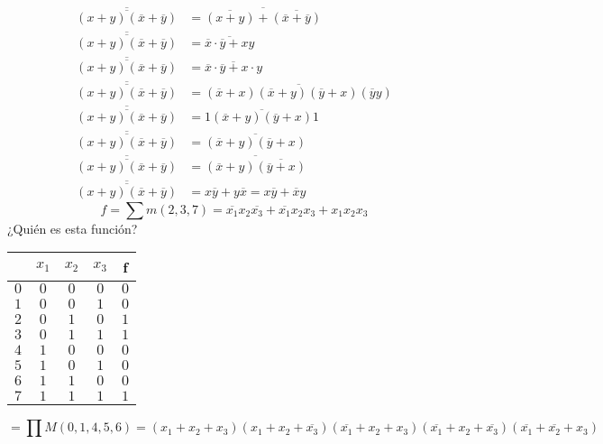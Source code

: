 \documentclass[../main.tex]{subfiles}
\begin{document}
\begin{align*}
	\overline{\overline{(x+y)(\overline{x}+\overline{y})}} &=
	\overline{\overline{(x+y)}+\overline{(\overline{x}+\overline{y})}}\\
	\overline{\overline{(x+y)(\overline{x}+\overline{y})}} &=
	\overline{\overline{x}\cdot\overline{y}+xy}\\
	\overline{\overline{(x+y)(\overline{x}+\overline{y})}} &=
	\overline{\overline{x}\cdot\overline{y}+x\cdot y}\\
	\overline{\overline{(x+y)(\overline{x}+\overline{y})}} &=
	\overline{(\overline{x}+x)(\overline{x}+y)(\overline{y}+x)(\overline{y}y)}\\
	\overline{\overline{(x+y)(\overline{x}+\overline{y})}} &=
	\overline{1(\overline{x}+y)(\overline{y}+x)1}\\
	\overline{\overline{(x+y)(\overline{x}+\overline{y})}} &=
	\overline{(\overline{x}+y)(\overline{y}+x)}\\
	\overline{\overline{(x+y)(\overline{x}+\overline{y})}} &=
	\overline{(\overline{x}+y)\overline{(\overline{y}+x)}}\\
	\overline{\overline{(x+y)(\overline{x}+\overline{y})}} &=
	x\overline{y}+y\overline{x} = \boxed{x\overline{y}+\overline{x}y}
\end{align*}
\[f=\sum m(2,3,7)=\overline{x_1}x_2\overline{x_3}+\overline{x_1}x_2x_3+x_1x_2x_3\]
¿Quién es esta función?
\begin{center}
	\begin{tabular}{c|ccc|c|}
		& $x_1$ & $x_2$ & $x_3$ & f\\
		\hline
		$0$ & $0$ & $0$ & $0$ & $0$\\
		$1$ & $0$ & $0$ & $1$ & $0$\\
		$2$ & $0$ & $1$ & $0$ & $1$\\
		$3$ & $0$ & $1$ & $1$ & $1$\\
		$4$ & $1$ & $0$ & $0$ & $0$\\
		$5$ & $1$ & $0$ & $1$ & $0$\\
		$6$ & $1$ & $1$ & $0$ & $0$\\
		$7$ & $1$ & $1$ & $1$ & $1$\\
	\end{tabular}
\end{center}
\[=\prod M(0,1,4,5,6)=
	(x_1+x_2+x_3)
	(x_1+x_2+\overline{x_3})
	(\overline{x_1}+x_2+x_3)
	(\overline{x_1}+x_2+\overline{x_3})
	(\overline{x_1}+\overline{x_2}+x_3)
\]
\end{document}
